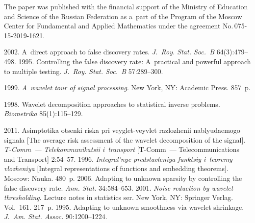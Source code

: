 

 


\Ack
\noindent
The paper was published with the financial support of the Ministry of Education and Science of the
 Russian Federation as a~part of the Program of the Moscow Center for Fundamental 
 and Applied Mathematics under the agreement No.\,075-15-2019-1621.


  \begin{multicols}{2}

\renewcommand{\bibname}{\protect\rmfamily References}

{\small\frenchspacing
 {%
 \begin{thebibliography}{99}
 2002. A~direct approach to false discovery rates. 
\textit{J.~Roy. Stat. Soc.~B} 64(3):479--498.
 1995. Controlling the false discovery rate: A~practical and powerful approach to multiple testing.
 \textit{J.~Roy. Stat. Soc.~B} 57:289--300.

 1999. \textit{A~wavelet tour of signal processing}. New York, NY: Academic Press. 857~p.

 1998. Wavelet decomposition approaches to statistical inverse problems. \textit{Biometrika} 85(1):115--129.
 
 2011. Asimptotika otsenki riska pri veyglet-veyvlet razlozhenii na\-blyu\-da\-emo\-go signala
  [The average risk assessment of the wavelet decomposition of the signal].
  \textit{T-Comm~--- Telekommunikatsii i~transport} [T-Comm~--- Telecommunications and Transport] 2:54--57.
 1996. \textit{Integral'nye predstavleniya funktsiy i~teoremy vlozheniya} 
 [Integral representations of functions and embedding theorems]. Moscow: Nauka. 480~p.
 2006. Adapting to unknown sparsity by controlling the false discovery rate. 
 \textit{Ann. Stat.} 34:584--653.
 2001. \textit{Noise reduction by wavelet thresholding}. 
Lecture notes in statistics ser. New York, NY: Springer Verlag. Vol.~161. 217~p.
 1995. Adapting to unknown smoothness via wavelet shrinkage. 
\textit{J.~Am. Stat. Assoc.} 90:1200--1224.



\end{thebibliography}}}
\end{multicols}
